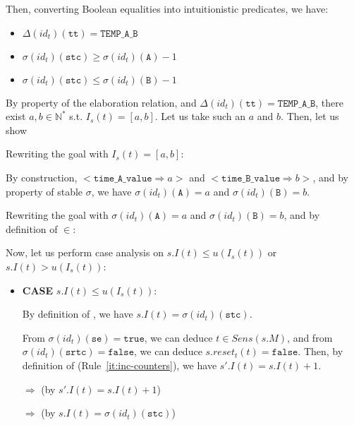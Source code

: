 \documentclass[dvipsnames,12pt]{article}
\begin{document}
\begin{niproof}
\begin{enumerate}
\begin{enumerate}
\begin{enumerate}
        Then, converting Boolean equalities into intuitionistic
        predicates, we have:
        \begin{itemize}
        \item $\Delta(id_t)(\texttt{tt})=\mathtt{TEMP\_A\_B}$
        \item $\sigma(id_t)(\texttt{stc})\ge{}\sigma(id_t)(\texttt{A})-1$
        \item $\sigma(id_t)(\texttt{stc})\le{}\sigma(id_t)(\texttt{B})-1$
        \end{itemize}

        By property of the elaboration relation, and
        $\Delta(id_t)(\texttt{tt})=\mathtt{TEMP\_A\_B}$, there exist
        $a,b\in\mathbb{N}^{*}$ s.t. $I_s(t)=[a,b]$. Let us take such
        an $a$ and $b$. Then, let us show 

        Rewriting the goal with $I_s(t)=[a,b]$:
        
        By construction, ${<}\mathtt{time\_A\_value\Rightarrow}{}a{>}$
        and ${<}\mathtt{time\_B\_value\Rightarrow}{}b{>}$, and by
        property of stable $\sigma$, we have $\sigma(id_t)(\texttt{A})=a$ and
        $\sigma(id_t)(\texttt{B})=b$.

        Rewriting the goal with $\sigma(id_t)(\texttt{A})=a$ and
        $\sigma(id_t)(\texttt{B})=b$, and by definition of $\in$:

        Now, let us perform case analysis on
        $s.I(t)\le{}u(I_s(t))$ or $s.I(t)>u(I_s(t))$:
        \begin{itemize}
        \item \textbf{CASE} $s.I(t)\le{}u(I_s(t))$:
          
          By definition of \upSim, we have $s.I(t)=\sigma(id_t)(\texttt{stc})$.

          From $\sigma(id_t)(\texttt{se})=\mathtt{true}$, we can deduce
          $t\in{}Sens(s.M)$, and from
          $\sigma(id_t)(\texttt{srtc})=\mathtt{false}$, we can deduce
          $s.reset_t(t)=\mathtt{false}$. Then, by definition of
          \dwSitpn{} (Rule~\ref{it:inc-counters}), we have
          $s'.I(t)=s.I(t)+1$.

          $\Rightarrow{}$
          (by $s'.I(t)=s.I(t)+1$)

          $\Rightarrow{}$
          (by $s.I(t)=\sigma(id_t)(\texttt{stc})$)
          

\end{itemize}
\end{enumerate}
\end{enumerate}
\end{enumerate}
\end{niproof}
\end{document}
